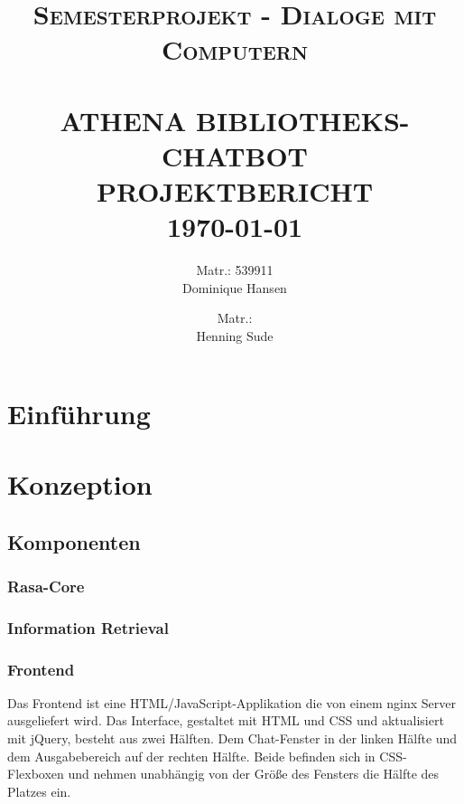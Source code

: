 \documentclass[12pt,a4paper]{article}
\title{ \normalsize \textsc{Semesterprojekt - Dialoge mit Computern}
		\\ [2.0cm]
		\HRule{0.5pt} \\ [0.2cm]
		{\Large \textbf{\uppercase{Athena Bibliotheks-chatbot}}} \\
	    {\large \textbf{\uppercase{Projektbericht}}}
		\HRule{2pt} \\ [0.5cm]
		\normalsize \today \vspace*{5\baselineskip}}
\date{}
\author{
		Matr.: 539911 \\ 
		Dominique Hansen \\
		\and
		Matr.: \\
		Henning Sude \\}
\begin{document}
\maketitle

\clearpage

\tableofcontents
\clearpage


\section{Einführung}

\section{Konzeption}

\subsection{Komponenten}

\subsubsection{Rasa-Core}

\subsubsection{Information Retrieval}



\subsubsection{Frontend}

Das Frontend ist eine HTML/JavaScript-Applikation die von einem nginx Server ausgeliefert wird.
Das Interface, gestaltet mit HTML und CSS und aktualisiert mit jQuery, besteht aus zwei Hälften.
Dem Chat-Fenster in der linken Hälfte und dem Ausgabebereich auf der rechten Hälfte.
Beide befinden sich in CSS-Flexboxen und nehmen unabhängig von der Größe des Fensters die Hälfte des Platzes ein.
\end{document}
